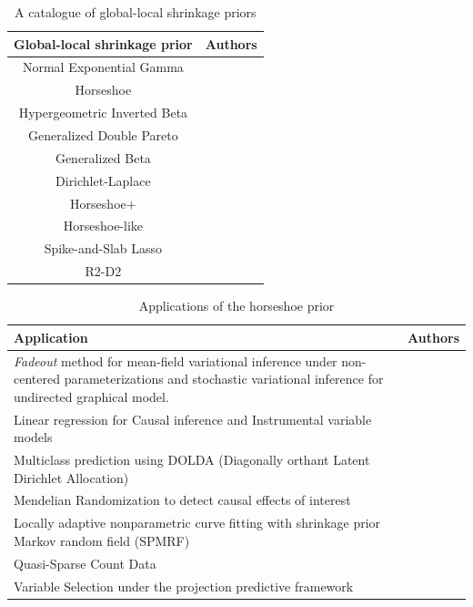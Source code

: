 \documentclass[11pt]{article}
\begin{document}
\begin{table}[htbp]
  \centering
  \caption{A catalogue of global-local shrinkage priors}
  \footnotesize{
    \begin{tabular}{|c|c|}
    \hline
    Global-local shrinkage prior  & Authors  \bigstrut\\
    \hline
    Normal Exponential Gamma & \citet{griffin2005alternative} \bigstrut[t]\\
    Horseshoe & \citet{carvalho2010horseshoe, carvalho2009handling} \\
    Hypergeometric Inverted Beta & \citet{polson2010large} \\
    Generalized Double Pareto & \citet{armagan2011generalized} \\
    Generalized Beta  & \citet{armagan2013generalized} \\
    Dirichlet-Laplace & \citet{bhattacharya2014dirichlet} \\
    Horseshoe+  & \citet{bhadra2015horseshoe+} \\
    Horseshoe-like & \citet{bhadra2017horseshoe} \\
    Spike-and-Slab Lasso & \citet{rovckova2016spike} \\
    R2-D2 & \citet{zhang2016high} \bigstrut[b]\\
    \hline
    \end{tabular}%
    }
  \label{tab:one-gps}%
\end{table}%

\begin{table}[htbp]
  \centering
  \caption{Applications of the horseshoe prior}
  \footnotesize{
    \begin{tabular}{|p{3in}|p{1.5in}|}
    \hline
    Application  & Authors \bigstrut\\
    \hline
    \textit{Fadeout} method for mean-field variational inference under non-centered parameterizations and stochastic variational inference for undirected graphical model.  & \citet{ingraham_bayesian_2016} \bigstrut[t]\\
    \hline
    Linear regression for Causal inference and Instrumental variable models  & \citet{hahn_shrinkage_2014, hahn_elliptical_2016} \\
    \hline
    Multiclass prediction using DOLDA (Diagonally orthant Latent Dirichlet Allocation)  & \citet{magnusson_dolda_2016} \\
    \hline
    Mendelian Randomization to detect causal effects of interest & \citet{berzuini_mendelian_2016} \\
    \hline 
    Locally adaptive nonparametric curve fitting with shrinkage prior Markov random field (SPMRF) & \citet{faulkner_bayesian_2015} \\
    \hline
    Quasi-Sparse Count Data & \citet{datta2016bayesian} \\
    \hline
    Variable Selection under the projection predictive framework  & \citet{piironen_projection_2015} \bigstrut[b]\\
    \hline
    \end{tabular}%
    }
  \label{tab:hs-apps}%
\end{table}%
\end{document}

